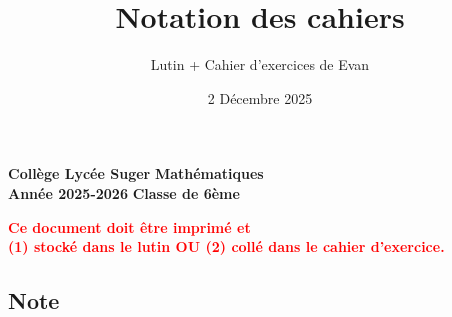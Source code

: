 \documentclass[answers]{exam}
\title{Notation des cahiers}
\author{Lutin + Cahier d'exercices de Evan}
\date{2 Décembre 2025}
\begin{document}
\textbf{Collège Lycée Suger}
\hfill
\textbf{Mathématiques} \\

\textbf{Année 2025-2026}
\hfill
\textbf{Classe de 6ème} \par

{\let\newpage\relax\maketitle}

\begin{tcolorbox}[
  colframe=red!90!black,
  fonttitle=\bfseries,
  boxsep=4pt,
  sharp corners,
]
\begin{center}
\textbf{\textcolor{red}{Ce document doit être imprimé et \\ (1) stocké dans le lutin OU (2) collé dans le cahier d'exercice.}}
\end{center}
\end{tcolorbox}

\subsection*{Note}
\end{document}
